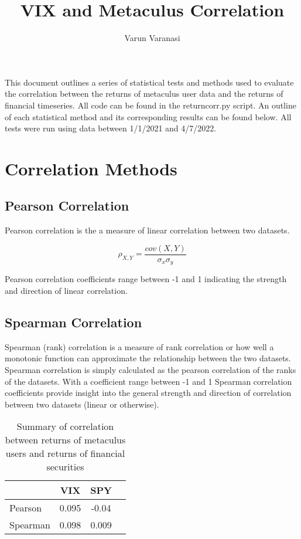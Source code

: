 \documentclass{article}
\title{VIX and Metaculus Correlation}
\author{Varun Varanasi}
\begin{document}
\maketitle

This document outlines a series of statistical tests and methods used to evaluate the correlation between the returns of metaculus user data and the returns of financial timeseries.
All code can be found in the return\textunderscore corr.py script. An outline of each statistical method and its corresponding results can be found below. All tests were run using data between 1/1/2021 and 4/7/2022.

\section*{Correlation Methods}
\subsection*{Pearson Correlation}
Pearson correlation is the a measure of linear correlation between two datasets. 

$$
\rho_{X,Y} = \frac{cov(X,Y)}{\sigma_x \sigma_y}
$$

Pearson correlation coefficients range between -1 and 1 indicating the strength and direction of linear correlation.


\subsection*{Spearman Correlation}

Spearman (rank) correlation is a measure of rank correlation or how well a monotonic function can approximate the relationship between the two datasets. Spearman correlation is simply calculated as the pearson correlation of the ranks of the datasets. With a coefficient range between -1 and 1 Spearman correlation coefficients provide insight into the general strength and direction of correlation between two datasets (linear or otherwise).

\begin{table}[h]
    \centering
\begin{tabular}{l||ccc}
    \toprule
     & \textbf{VIX} & \textbf{SPY} & \\
    \midrule
    Pearson & 0.095 & -0.04 \\
    Spearman & 0.098 & 0.009\\
    \bottomrule
\end{tabular}
\caption{Summary of correlation between returns of metaculus users and returns of financial securities}
\end{table}
\end{document}
